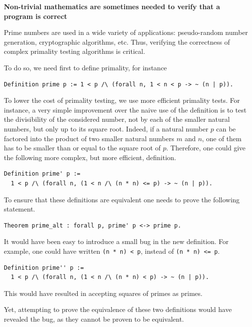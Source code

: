 \begin{framed}
\vspace*{-0.5cm}
\begin{center} {\bf \Large Non-trivial mathematics are sometimes
needed to verify that a program is correct}
\end{center}

Prime numbers are used in a wide variety of applications:
pseudo-random number generation, cryptographic algorithms, etc.  Thus,
verifying the correctness of complex primality testing algorithms is
critical.

To do so, we need first to define primality, for instance
\begin{verbatim}
Definition prime p := 1 < p /\ (forall n, 1 < n < p -> ~ (n | p)).
\end{verbatim}

To lower the cost of primality testing, we use more efficient
primality tests.  For instance, a very simple improvement over the
naive use of the definition is to test the divisibility of the
considered number, not by each of the smaller natural numbers, but
only up to its square root.  Indeed, if a natural number $p$ can be
factored into the product of two smaller natural numbers $m$ and $n$,
one of them has to be smaller than or equal to the square root of $p$.
Therefore, one could give the following more complex, but more
efficient, definition.

\begin{verbatim}
Definition prime' p :=
  1 < p /\ (forall n, (1 < n /\ (n * n) <= p) -> ~ (n | p)).
\end{verbatim}

To ensure that these definitions are equivalent one needs to prove
the following statement.

\begin{verbatim}
Theorem prime_alt : forall p, prime' p <-> prime p.
\end{verbatim}

It would have been easy to introduce a small bug
in the new definition.  For example, one could have written
\verb!(n * n) < p!, instead of \verb!(n * n) <= p!.

\begin{verbatim}
Definition prime'' p :=
  1 < p /\ (forall n, (1 < n /\ (n * n) < p) -> ~ (n | p)).
\end{verbatim}
This would have resulted in accepting squares of primes as primes.

Yet, attempting to prove the equivalence of these two definitions would
have revealed the bug, as they cannot be proven to be equivalent.
\end{framed}
